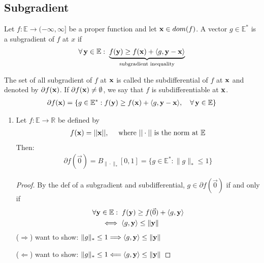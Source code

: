 \documentclass[11pt]{article}
\begin{document}
\subsection{Subgradient}
\begin{definition}
    Let $f: \mathbb{E} \to (-\infty,\infty]$ be a proper function and let ${\mathbf{x}} \in dom(f)$. A
    vector $g \in \mathbb{E}^{*}$ is a subgradient of $f$ at $x$ if 
    \begin{align*}
        \forall \, \vy \in \mathbb{E}: \; \underbrace{f(\vy) \ge f(\vx) + \langle g, \vy-\vx \rangle}
        _{\text{subgradient inequality}}
    \end{align*}

The set of all subgradient of $f$ at ${\mathbf{x}}$ is called the subdifferential of $f$ at ${\mathbf{x}}$
and denoted by $\partial f({\mathbf{x}})$. If $\partial f({\mathbf{x}}) \neq \emptyset$,
 we say that $f$ is subdifferentiable at 
${\mathbf{x}}$.
\begin{align*}
    \partial f({\mathbf{x}}) = \{ g \in \mathbb{E}^{*}: f({\mathbf{y}}) \ge f({\mathbf{x}}) + \langle g,{\mathbf{y}}-{\mathbf{x}} \rangle 
    , \quad \forall \, {\mathbf{y}} \in \mathbb{E}\}
\end{align*}
\begin{example}
    \begin{enumerate}
        \item Let $f: \mathbb{E} \to \mathbb{R}$ be defined by 
        \begin{align*}
            f({\mathbf{x}}) = ||{\mathbf{x}}||, \quad \text{ where }||\cdot || \text{ is the norm at }\mathbb{E}
        \end{align*}
        Then:
        \begin{align*}
            \partial f(\vec{0}) = B_{\|\cdot \|_{*}}[0,1] = \{ 
                g \in \mathbb{E}^{*}: \| g \| _{*} \le 1
             \}
        \end{align*}
        \begin{proof}
            By the def of a subgradient and subdifferential, $g \in \partial f(\vec{0})$ if and only if 
            \begin{align*}
                \forall {\mathbf{y}} &\in \mathbb{E}: \; f({\mathbf{y}}) \ge f(\vec{0}) + \langle g,{\mathbf{y}} \rangle\\
                &\iff \langle g,{\mathbf{y}} \rangle \le \| {\mathbf{y}} \| 
            \end{align*}
            ($\Longrightarrow$) want to show: $\| g \| _{*} \le 1 \Longrightarrow 
            \langle g,{\mathbf{y}} \rangle \le \| {\mathbf{y}} \| $

            ($\Longleftarrow$) want to show: $\| g \| _{*} \le 1 \Longleftarrow 
            \langle g,{\mathbf{y}} \rangle \le \| {\mathbf{y}} \| $
        \end{proof}
    \end{enumerate}
\end{example}









\end{definition}
\end{document}
